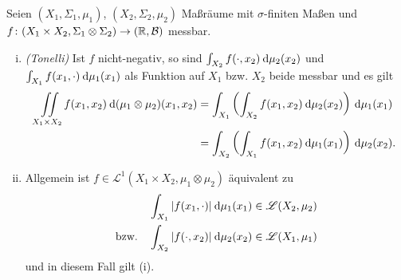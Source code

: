 \documentclass[skript.tex]{subfiles}
\begin{document}
	\begin{theorem}[Fubini]
		Seien $(X_1,\Sigma_1,\mu_1)$, $(X_2,\Sigma_2,\mu_2)$ Maßräume mit $\sigma$-finiten Maßen und \\
		$f \colon (X_1 \times X_2, \Sigma_1\otimes\Sigma_2) \to (\mathbb{R},\mathcal{B})$ messbar.
		\begin{enumerate}[(i)]
			\item \emph{(Tonelli)} Ist $f$ nicht-negativ, so sind $\int_{X_2}f(\cdot,x_2) \: \mathrm{d} \mu_2(x_2)$ und $\int_{X_1}f(x_1,\cdot) \: \mathrm{d} \mu_1(x_1)$ als Funktion auf $X_1$ bzw. $X_2$ beide messbar und es gilt
			\begin{align*}
				\iint\limits_{X_1 \times X_2} f(x_1,x_2) \: \mathrm{d}(\mu_1\otimes\mu_2)(x_1,x_2)
				&= \int_{X_1}\left(
					\int_{X_2}f(x_1,x_2)\: \mathrm{d}\mu_2(x_2)
				\right) \: \mathrm{d} \mu_1(x_1) \\
				&= \int_{X_2}\left(
				\int_{X_1}f(x_1,x_2)\: \mathrm{d}\mu_1(x_1)
				\right) \: \mathrm{d} \mu_2(x_2).
			\end{align*}
			
			\item Allgemein ist $f \in \mathscr{L}^1(X_1 \times X_2, \mu_1\otimes\mu_2)$ äquivalent zu
			\begin{align*}
				&\int_{X_1} |f(x_1,\cdot)| \: \mathrm{d} \mu_1(x_1) \in \mathscr{L}(X_2,\mu_2) \\
				\text{bzw.\quad} &\int_{X_2} |f(\cdot,x_2)| \: \mathrm{d} \mu_2(x_2) \in \mathscr{L}(X_1,\mu_1)
			\end{align*}
			und in diesem Fall gilt (i).
		\end{enumerate}
	\end{theorem}
\end{document}
